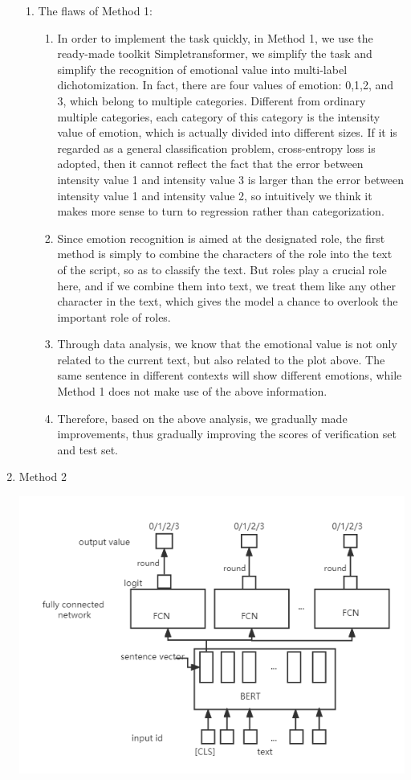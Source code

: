 \documentclass[12pt,twocolumn,letterpaper]{article}
\begin{document}
\begin{enumerate}
\begin{enumerate}
\item The flaws of Method 1:
\begin{enumerate}

\item In order to implement the task quickly, in Method 1, we use the ready-made toolkit Simpletransformer, we simplify the task and simplify the recognition of emotional value into multi-label dichotomization. In fact, there are four values of emotion: 0,1,2, and 3, which belong to multiple categories. 
Different from ordinary multiple categories, each category of this category is the intensity value of emotion, which is actually divided into different sizes. If it is regarded as a general classification problem, cross-entropy loss is adopted, then it cannot reflect the fact that the error between intensity value 1 and intensity value 3 is larger than the error between intensity value 1 and intensity value 2, so intuitively we think it makes more sense to turn to regression rather than categorization.  
\item Since emotion recognition is aimed at the designated role, the first method is simply to combine the characters of the role into the text of the script, so as to classify the text. But roles play a crucial role here, and if we combine them into text, we treat them like any other character in the text, which gives the model a chance to overlook the important role of roles.  
\item Through data analysis, we know that the emotional value is not only related to the current text, but also related to the plot above. The same sentence in different contexts will show different emotions, while Method 1 does not make use of the above information.  
\item Therefore, based on the above analysis, we gradually made improvements, thus gradually improving the scores of verification set and test set.    
\end{enumerate}
\end{enumerate}

\item Method 2

\includegraphics[scale=0.5]{Method2.png}


\end{enumerate}
\end{document}
